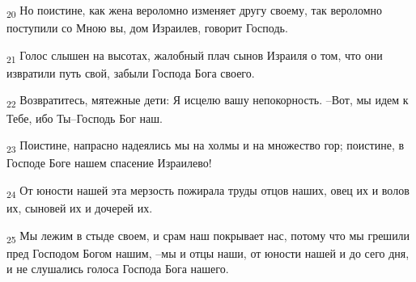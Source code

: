 \begin{tcolorbox}
\textsubscript{20} Но поистине, как жена вероломно изменяет другу своему, так вероломно поступили со Мною вы, дом Израилев, говорит Господь.
\end{tcolorbox}
\begin{tcolorbox}
\textsubscript{21} Голос слышен на высотах, жалобный плач сынов Израиля о том, что они извратили путь свой, забыли Господа Бога своего.
\end{tcolorbox}
\begin{tcolorbox}
\textsubscript{22} Возвратитесь, мятежные дети: Я исцелю вашу непокорность. --Вот, мы идем к Тебе, ибо Ты--Господь Бог наш.
\end{tcolorbox}
\begin{tcolorbox}
\textsubscript{23} Поистине, напрасно надеялись мы на холмы и на множество гор; поистине, в Господе Боге нашем спасение Израилево!
\end{tcolorbox}
\begin{tcolorbox}
\textsubscript{24} От юности нашей эта мерзость пожирала труды отцов наших, овец их и волов их, сыновей их и дочерей их.
\end{tcolorbox}
\begin{tcolorbox}
\textsubscript{25} Мы лежим в стыде своем, и срам наш покрывает нас, потому что мы грешили пред Господом Богом нашим, --мы и отцы наши, от юности нашей и до сего дня, и не слушались голоса Господа Бога нашего.
\end{tcolorbox}
